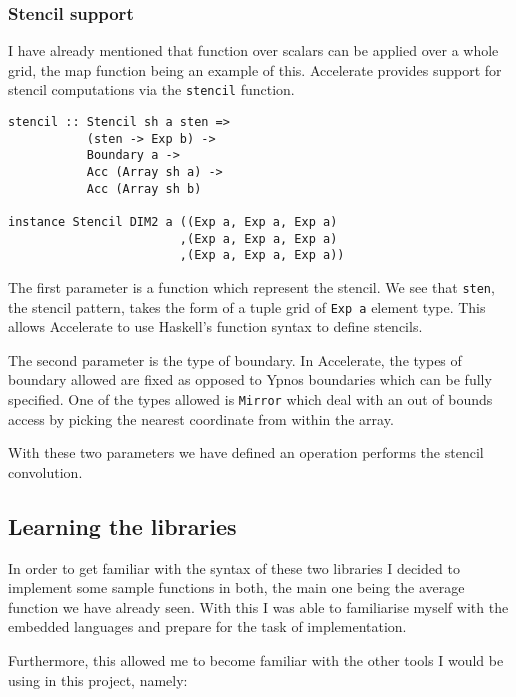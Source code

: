 \subsubsection{Stencil support}

I have already mentioned that function over scalars can be applied over
a whole grid, the map function being an example of this. Accelerate
provides support for stencil computations via the \texttt{stencil}
function.

\begin{verbatim}
stencil :: Stencil sh a sten =>
           (sten -> Exp b) ->
           Boundary a ->
           Acc (Array sh a) ->
           Acc (Array sh b)

instance Stencil DIM2 a ((Exp a, Exp a, Exp a)
                        ,(Exp a, Exp a, Exp a)
                        ,(Exp a, Exp a, Exp a))
\end{verbatim}

The first parameter is a function which represent the stencil. We see
that \texttt{sten}, the stencil pattern, takes the form of a tuple grid
of \texttt{Exp a} element type. This allows Accelerate to use Haskell's
function syntax to define stencils.

The second parameter is the type of boundary. In Accelerate, the types
of boundary allowed are fixed as opposed to Ypnos boundaries which can
be fully specified. One of the types allowed is \texttt{Mirror} which
deal with an out of bounds access by picking the nearest coordinate from
within the array.

With these two parameters we have defined an operation performs the
stencil convolution.

\subsection{Learning the libraries}

In order to get familiar with the syntax of these two libraries I
decided to implement some sample functions in both, the main one being
the average function we have already seen. With this I was able to
familiarise myself with the embedded languages and prepare for the task
of implementation.

Furthermore, this allowed me to become familiar with the other tools I
would be using in this project, namely:


